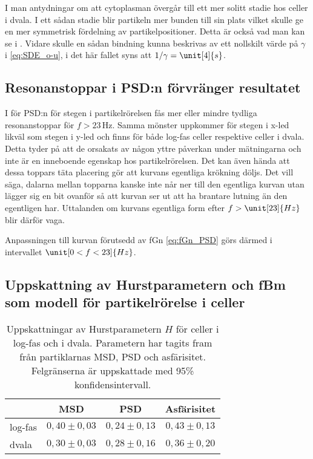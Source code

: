 I \cite{Midtveldt_etal2016}  man antydningar om att cytoplasman övergår till ett mer solitt stadie hos celler i dvala. I ett sådan stadie blir partikeln mer bunden till sin plats vilket skulle ge en mer symmetrisk fördelning av partikelpositioner. Detta är också vad man kan se i . Vidare skulle en sådan bindning kunna beskrivas av ett nollskilt värde på $\gamma$ i \eqref{eq:SDE_o-u}, i det här fallet syns att $1/\gamma=\unit[4]{s}$. 



\subsection{Resonanstoppar i PSD:n förvränger resultatet}

I  för PSD:n för stegen i partikelrörelsen fås mer eller mindre tydliga resonanstoppar för $f>23$\,Hz. Samma mönster uppkommer för stegen i x-led likväl som stegen i y-led och finns för både log-fas celler respektive celler i dvala. Detta tyder på att de orsakats av någon yttre påverkan under mätningarna och inte är en inneboende egenskap hos partikelrörelsen. Det kan även hända att dessa toppars täta placering gör att kurvans egentliga krökning döljs. Det vill säga, dalarna mellan topparna kanske inte når ner till den egentliga kurvan utan lägger sig en bit ovanför så att kurvan ser ut att ha brantare lutning än den egentligen har. Uttalanden om kurvans egentliga form efter $f>\unit[23]{Hz}$ blir därför vaga.

Anpassningen till kurvan förutsedd av fGn \eqref{eq:fGn_PSD} görs därmed i intervallet $\unit[0<f<23]{Hz}$. 

\subsection{Uppskattning av Hurstparametern och fBm som modell för partikelrörelse i celler}


\begin{table}
\centering
\caption{Uppskattningar av Hurstparametern $H$ för celler i log-fas och i dvala. Parametern har tagits fram från partiklarnas MSD, PSD och asfärisitet. Felgränserna är uppskattade med 95\% konfidensintervall.
}
\label{tab:H_values}
\begin{adjustbox}{center}
\begin{tabular}{l|c|c|c|}

\cline{2-4}
& MSD & PSD & Asfärisitet
\\ \hline
\multicolumn{1}{|l|}{log-fas}
& $0,40\pm 0,03$ & $0,24\pm 0,13$ %
& $0,43\pm0,13$
\\ \hline
\multicolumn{1}{|l|}{dvala}
& $0,30\pm0,03$ & $0,28\pm0,16$ & $0,36\pm 0,20$
\\ \hline
\end{tabular}
\end{adjustbox}
\end{table}

